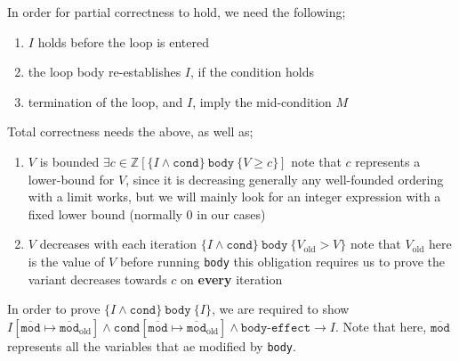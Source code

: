 \documentclass[a4paper, 12pt]{article}
\begin{document}
                In order for partial correctness to hold, we need the following;
                \begin{enumerate}[1.]
                    \itemsep0em
                    \item $I$ holds before the loop is entered
                    \item the loop body re-establishes $I$, if the condition holds
                    \item termination of the loop, and $I$, imply the mid-condition $M$
                \end{enumerate}
                Total correctness needs the above, as well as;
                \begin{enumerate}[1.]
                    \itemsep0em
                    \setcounter{enumi}{3}
                    \item $V$ is bounded
                        \subitem $\exists c \in \mathbb{Z} [\{I \land \texttt{cond}\}\ \texttt{body}\ \{V \geq c\}]$
                        \subitem note that $c$ represents a lower-bound for $V$, since it is decreasing
                        \subitem generally any well-founded ordering with a limit works, but we will mainly look for an integer expression with a fixed lower bound (normally 0 in our cases)
                    \item $V$ decreases with each iteration
                        \subitem $\{I \land \texttt{cond}\}\ \texttt{body}\ \{V_\text{old} > V\}$
                        \subitem note that $V_\text{old}$ here is the value of $V$ before running \texttt{body}
                        \subitem this obligation requires us to prove the variant decreases towards $c$ on \textbf{every} iteration
                \end{enumerate}
                In order to prove $\{ I \land \texttt{cond} \}\ \texttt{body}\ \{ I \}$, we are required to show $I[\overline{\texttt{mod}} \mapsto \overline{\texttt{mod}}_\text{old}] \land \texttt{cond}[\overline{\texttt{mod}} \mapsto \overline{\texttt{mod}}_\text{old}] \land \texttt{body-effect} \rightarrow I$. Note that here, $\overline{\texttt{mod}}$ represents all the variables that ae modified by \texttt{body}.
                \medskip
\end{document}

